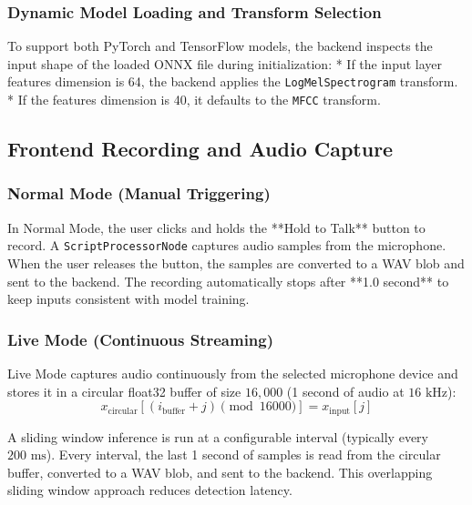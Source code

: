 \subsubsection{Dynamic Model Loading and Transform Selection}
To support both PyTorch and TensorFlow models, the backend inspects the input shape of the loaded ONNX file during initialization:
* If the input layer features dimension is 64, the backend applies the \texttt{LogMelSpectrogram} transform.
* If the features dimension is 40, it defaults to the \texttt{MFCC} transform.

\subsection{Frontend Recording and Audio Capture}

\subsubsection{Normal Mode (Manual Triggering)}
In Normal Mode, the user clicks and holds the **Hold to Talk** button to record. A \texttt{ScriptProcessorNode} captures audio samples from the microphone. When the user releases the button, the samples are converted to a WAV blob and sent to the backend. The recording automatically stops after **1.0 second** to keep inputs consistent with model training.

\subsubsection{Live Mode (Continuous Streaming)}
Live Mode captures audio continuously from the selected microphone device and stores it in a circular float32 buffer of size $16,000$ (1 second of audio at $16\text{ kHz}$):
\begin{equation}
    x_{\text{circular}}[(i_{\text{buffer}} + j) \pmod{16000}] = x_{\text{input}}[j]
\end{equation}

A sliding window inference is run at a configurable interval (typically every $200\text{ ms}$). Every interval, the last 1 second of samples is read from the circular buffer, converted to a WAV blob, and sent to the backend. This overlapping sliding window approach reduces detection latency.

